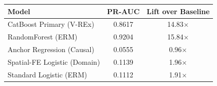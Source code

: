 \begin{tabular}{lcc}
\toprule
\textbf{Model} & \textbf{PR-AUC} & \textbf{Lift over Baseline} \\
\midrule
CatBoost Primary (V-REx) & 0.8617 & 14.83$\times$ \\
RandomForest (ERM) & 0.9204 & 15.84$\times$ \\
Anchor Regression (Causal) & 0.0555 & 0.96$\times$ \\
Spatial-FE Logistic (Domain) & 0.1139 & 1.96$\times$ \\
Standard Logistic (ERM) & 0.1112 & 1.91$\times$ \\
\bottomrule
\end{tabular}
